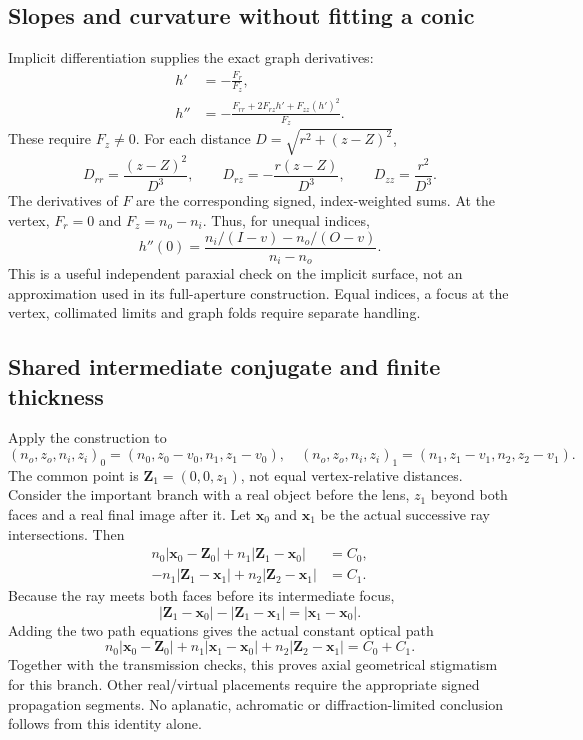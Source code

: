 \subsection{Slopes and curvature without fitting a conic}
Implicit differentiation supplies the exact graph derivatives:
\begin{align}
 h'&=-\frac{F_r}{F_z},\label{eq:slope}\\
 h''&=-\frac{F_{rr}+2F_{rz}h'+F_{zz}(h')^2}{F_z}.\label{eq:second}
\end{align}
These require $F_z\ne0$. For each distance $D=\sqrt{r^2+(z-Z)^2}$,
\begin{equation}\label{eq:distance-derivatives}
 D_{rr}=\frac{(z-Z)^2}{D^3},\qquad
 D_{rz}=-\frac{r(z-Z)}{D^3},\qquad D_{zz}=\frac{r^2}{D^3}.
\end{equation}
The derivatives of $F$ are the corresponding signed, index-weighted sums.
At the vertex, $F_r=0$ and $F_z=n_o-n_i$. Thus, for unequal indices,
\begin{equation}\label{eq:vertex-curvature}
 h''(0)=\frac{n_i/(I-v)-n_o/(O-v)}{n_i-n_o}.
\end{equation}
This is a useful independent paraxial check on the implicit surface, not an
approximation used in its full-aperture construction. Equal indices, a focus
at the vertex, collimated limits and graph folds require separate handling.

\subsection{Shared intermediate conjugate and finite thickness}
Apply the construction to
\begin{equation}\label{eq:two-local}
 (n_o,z_o,n_i,z_i)_0=(n_0,z_0-v_0,n_1,z_1-v_0),\quad
 (n_o,z_o,n_i,z_i)_1=(n_1,z_1-v_1,n_2,z_2-v_1).
\end{equation}
The common point is $\mathbf Z_1=(0,0,z_1)$, not equal vertex-relative
distances. Consider the important branch with a real object before the lens,
$z_1$ beyond both faces and a real final image after it. Let $\mathbf x_0$
and $\mathbf x_1$ be the actual successive ray intersections. Then
\begin{align}
 n_0|\mathbf x_0-\mathbf Z_0|+n_1|\mathbf Z_1-\mathbf x_0|&=C_0,\\
 -n_1|\mathbf Z_1-\mathbf x_1|+n_2|\mathbf Z_2-\mathbf x_1|&=C_1.
\end{align}
Because the ray meets both faces before its intermediate focus,
\begin{equation}
 |\mathbf Z_1-\mathbf x_0|-|\mathbf Z_1-\mathbf x_1|
 =|\mathbf x_1-\mathbf x_0|.
\end{equation}
Adding the two path equations gives the actual constant optical path
\begin{equation}\label{eq:pair-opl}
 n_0|\mathbf x_0-\mathbf Z_0|+n_1|\mathbf x_1-\mathbf x_0|
 +n_2|\mathbf Z_2-\mathbf x_1|=C_0+C_1.
\end{equation}
Together with the transmission checks, this proves axial geometrical
stigmatism for this branch. Other real/virtual placements require the
appropriate signed propagation segments. No aplanatic, achromatic or
diffraction-limited conclusion follows from this identity alone.


